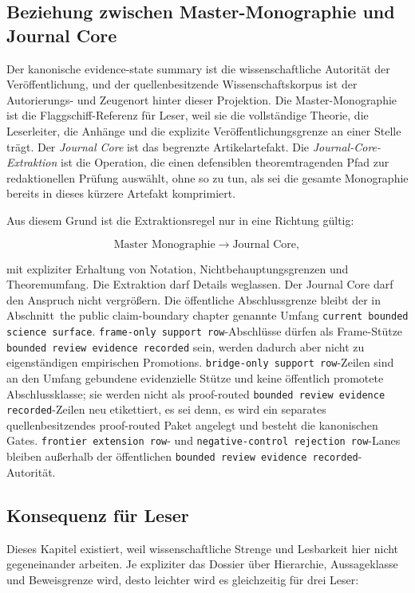 \subsection{Beziehung zwischen Master-Monographie und Journal Core}

Der kanonische evidence-state summary ist die wissenschaftliche Autorität der Veröffentlichung,
und der quellenbesitzende Wissenschaftskorpus ist der Autorierungs- und
Zeugenort hinter dieser Projektion. Die Master-Monographie ist die
Flaggschiff-Referenz für Leser, weil sie die vollständige Theorie, die
Leserleiter, die Anhänge und die explizite Veröffentlichungsgrenze an einer
Stelle trägt.
Der \emph{Journal Core} ist das begrenzte Artikelartefakt. Die
\emph{Journal-Core-Extraktion} ist die Operation, die einen defensiblen
theoremtragenden Pfad zur redaktionellen Prüfung auswählt, ohne so zu tun, als
sei die gesamte Monographie bereits in dieses kürzere Artefakt komprimiert.

Aus diesem Grund ist die Extraktionsregel nur in eine Richtung gültig:

\[
\text{Master Monographie} \longrightarrow \text{Journal Core},
\]

mit expliziter Erhaltung von Notation, Nichtbehauptungsgrenzen und Theoremumfang.
Die Extraktion darf Details weglassen. Der Journal Core darf den Anspruch nicht
vergrößern.
Die öffentliche Abschlussgrenze bleibt der in
Abschnitt~the public claim-boundary chapter genannte Umfang
\texttt{current bounded science surface}. \texttt{frame-only support row}-Abschlüsse dürfen als
Frame-Stütze \texttt{bounded review evidence recorded} sein, werden dadurch aber nicht zu eigenständigen
empirischen Promotions. \texttt{bridge-only support row}-Zeilen sind an den Umfang
gebundene evidenzielle Stütze und keine öffentlich promotete Abschlussklasse;
sie werden nicht als proof-routed \texttt{bounded review evidence recorded}-Zeilen neu etikettiert, es
sei denn, es wird ein separates quellenbesitzendes proof-routed Paket
angelegt und besteht die kanonischen Gates. \texttt{frontier extension row}- und
\texttt{negative-control rejection row}-Lanes bleiben außerhalb der öffentlichen \texttt{bounded review evidence recorded}-Autorität.

\subsection{Konsequenz für Leser}

Dieses Kapitel existiert, weil wissenschaftliche Strenge und Lesbarkeit hier
nicht gegeneinander arbeiten.
Je expliziter das Dossier über Hierarchie, Aussageklasse und Beweisgrenze wird,
desto leichter wird es gleichzeitig für drei Leser:

